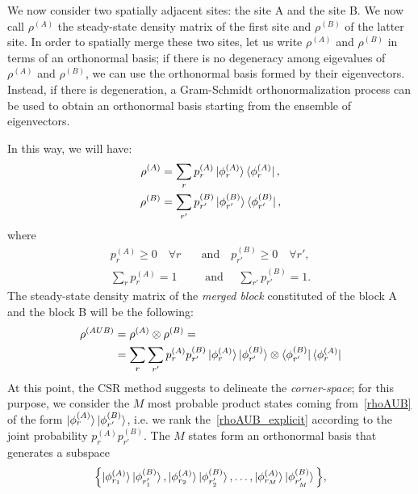 We now consider two spatially adjacent sites: the site A and the site B. We now call $\rho^{(A)}$ the steady-state density matrix of the first site and $\rho^{(B)}$ of the latter site. In order to spatially merge these two sites, let us write $\rho^{(A)}$ and $\rho^{(B)}$ in terms of an orthonormal basis; if there is no degeneracy among eigevalues of $\rho^{(A)}$ and $\rho^{(B)}$, we can use the orthonormal basis formed by their eigenvectors. Instead, if there is degeneration, a Gram-Schmidt orthonormalization process can be used to obtain an orthonormal basis starting from the ensemble of eigenvectors.

In this way, we will have:
\begin{equation}
    \begin{split}
        \rho^{(A)} & = \sum_r p_r^{(A)}\ket{\phi_r^{(A)}}\bra{\phi_r^{(A)}}, \\
        \rho^{(B)} & = \sum_{r'} p_{r'}^{(B)}\ket{\phi_{r'}^{(B)}}\bra{\phi_{r'}^{(B)}},
    \end{split}
\end{equation}
where
\begin{equation*}
    \begin{split}
        p_r^{(A)} \geq 0 \quad \forall r \quad &\textrm{and} \quad p_{r'}^{(B)} \geq 0 \quad\forall r', \\
        \sum_{r} p_r^{(A)} = 1 \quad &\textrm{ and } \quad \sum_{r'} p_{r'}^{(B)} = 1.
    \end{split}
\end{equation*}
The steady-state density matrix of the \emph{merged block} constituted of the block A and the block B will be the following:
\begin{align}
\label{rhoAUB}
    \rho^{(AUB)} &= \rho^{(A)} \otimes \rho^{(B)} = \\
    \label{rhoAUB_explicit}
    &= \sum_{r} \sum_{r'} p_r^{(A)}p_{r'}^{(B)}\ket{\phi_r^{(A)}}\ket{\phi_{r'}^{(B)}} \otimes \bra{\phi_{r'}^{(B)}}\bra{\phi_{r}^{(A)}}
\end{align}
At this point, the CSR method suggests to delineate the \emph{corner-space}; for this purpose, we consider the $M$ most probable product states coming from~\ref{rhoAUB} of the form $\ket{\phi_{r}^{(A)}}\ket{\phi_{r'}^{(B)}}$, i.e. we rank the~\ref{rhoAUB_explicit} according to the joint probability $p_r^{(A)}p_{r'}^{(B)}$. The $M$ states form an orthonormal basis that generates a subspace
\begin{equation}
\label{basis_corner}
    \Bigl\{\ket{\phi_{r_1}^{(A)}}\ket{\phi_{r_1'}^{(B)}}, \ket{\phi_{r_2}^{(A)}}\ket{\phi_{r_2'}^{(B)}}, \dots, \ket{\phi_{r_M}^{(A)}}\ket{\phi_{r_M'}^{(B)}} \Bigl\},
\end{equation}
